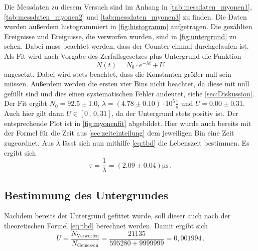 Die Messdaten zu diesem Versuch sind im Anhang in \autoref{tab:messdaten_myonen1}, \autoref{tab:messdaten_myonen2} und \autoref{tab:messdaten_myonen3} zu finden.
Die Daten wurden außerdem histogrammiert in \autoref{fig:histogramm} aufgetragen.
Die gezählten Ereignisse und Ereignisse, die verworfen wurden, sind in \autoref{fig:untergrund} zu sehen.
Dabei muss beachtet werden, dass der Counter einmal durchgelaufen ist.
Als Fit wird nach Vorgabe des Zerfallsgesetzes plus Untergrund die Funktion
\begin{equation*}
    N(t) = N_0 \cdot e^{- \lambda t} + U
\end{equation*} 
angesetzt.
Dabei wird stets beachtet, dass die Konstanten größer null sein müssen.
Außerdem werden die ersten vier Bins nicht beachtet, da diese mit null gefüllt sind und dies einen systematischen Fehler andeutet, siehe \autoref{sec:Diskussion}.
Der Fit ergibt $N_0 = 92.5 \pm 1.0$, $\lambda = (4.78 \pm 0.10) \cdot 10^5 \frac{1}{\unit{\second}}$ und $U = 0.00 \pm 0.31$.
Auch hier gilt dann $U \in [0 \, , \, 0,31]$, da der Untergrund stets positiv ist.
Der entsprechende Plot ist in \autoref{fig:myonenfit} abgebildet.
Hier wurde auch bereits mit der Formel für die Zeit aus \autoref{sec:zeiteinteilung} dem jeweiligen Bin eine Zeit zugeordnet.
Aus $\lambda$ lässt sich nun mithilfe \autoref{eq:tbd} die Lebenszeit bestimmen.
Es ergibt sich
\begin{equation}
    \tau = \frac{1}{\lambda} = (2.09\pm 0.04) \unit{\micro\second} \, .
\end{equation}

\subsection{Bestimmung des Untergrundes} \label{sec:untergrund_ausw}

Nachdem bereits der Untergrund gefittet wurde, soll dieser auch nach der theoretischen Formel \autoref{eq:tbd} berechnet werden.
Damit ergibt sich
\begin{equation*}
    U = \frac{N_\text{Verworfen}}{N_\text{Gemessen}} = \frac{21135}{595280 + 9999999} = 0,001994 \, .
\end{equation*} 